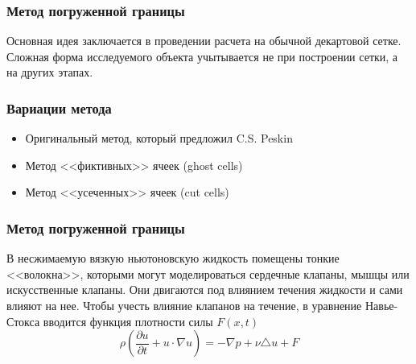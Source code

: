 \documentclass[14pt]{beamer}
\begin{document}
\begin{frame}
\frametitle{Метод погруженной границы}
Основная идея заключается в проведении расчета на обычной декартовой сетке. Сложная форма исследуемого объекта учытывается не при построении сетки, а на других этапах.
\end{frame}

\begin{frame}
\frametitle{Вариации метода}
\begin{itemize}
    \item \alert<+>{Оригинальный метод, который предложил C.S. Peskin}
    \item \alert<+>{Метод <<фиктивных>> ячеек (ghost cells)}
    \item \alert<+>{Метод <<усеченных>> ячеек (cut cells)}
\end{itemize}
\end{frame}

\begin{frame}
\frametitle{Метод погруженной границы}
В несжимаемую вязкую ньютоновскую жидкость помещены тонкие <<волокна>>, которыми могут моделироваться сердечные клапаны, мышцы или искусственные клапаны. Они двигаются под влиянием течения жидкости и сами влияют на нее.
Чтобы учесть влияние клапанов на течение, в уравнение Навье-Стокса вводится функция плотности силы $F(x, t)$
\begin{equation}
    \rho (\frac{\partial u}{\partial t} + u \cdot \nabla u) = - \nabla p + \nu \triangle u + F
\end{equation}
\end{frame}
\end{document}
